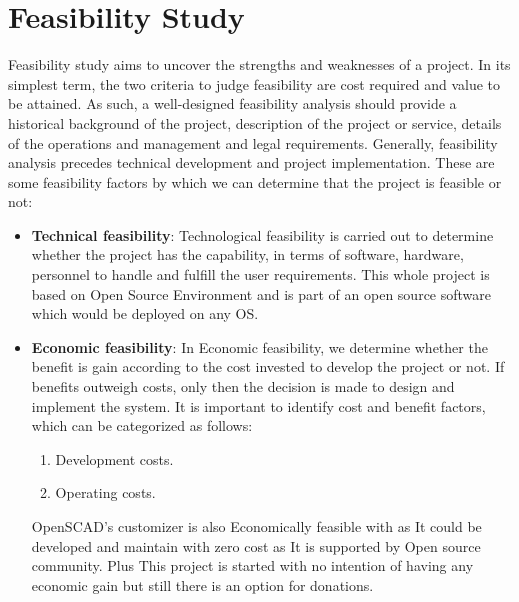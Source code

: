 \section{Feasibility Study}
Feasibility study aims to uncover the strengths and weaknesses of
a project. In its simplest term, the two criteria to judge feasibility
are cost required and value to be attained. As such, a well-designed
feasibility analysis should provide a historical background of the
project, description of the project or service, details of the
operations and management and legal requirements. Generally, feasibility
analysis precedes technical development and project implementation.
These are some feasibility factors by which we can determine that
the project is feasible or not:
\begin{itemize}
\item {\bf{Technical feasibility}}: Technological feasibility is carried
out to determine whether the project has the capability, in terms of
software, hardware, personnel to handle and fulfill the user requirements. This whole project is based on Open
Source Environment and is part of an open source software which would be deployed on any OS.

\item {\bf{Economic feasibility}}: In Economic feasibility, we
determine whether the benefit is gain according to the cost invested
to develop the project or not. If benefits outweigh costs, only then
the decision is made to design and implement the system. It is
important to identify cost and benefit factors, which can be categorized
as follows:
\begin{enumerate}
\item Development costs.
\item Operating costs.
\end{enumerate}
OpenSCAD's customizer is also Economically feasible with as It could be developed and maintain with zero cost as It is supported by Open source community.
Plus This project is started with no intention of having any economic gain but still there is an option for donations.

\end{itemize}


